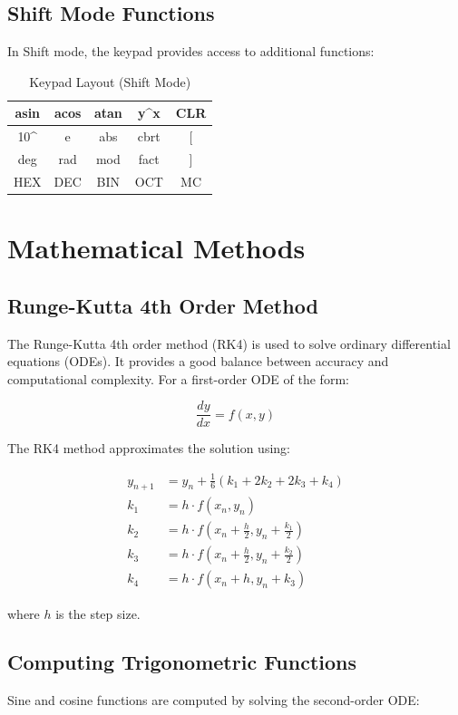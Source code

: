\documentclass[12pt,a4paper]{article}
\begin{document}
\subsection{Shift Mode Functions}
In Shift mode, the keypad provides access to additional functions:

\begin{table}[h]
\centering
\begin{tabular}{|c|c|c|c|c|}
\hline
asin & acos & atan & y\textasciicircum x & CLR \\
\hline
10\textasciicircum & e & abs & cbrt & [ \\
\hline
deg & rad & mod & fact & ] \\
\hline
HEX & DEC & BIN & OCT & MC \\
\hline
\end{tabular}
\caption{Keypad Layout (Shift Mode)}
\end{table}

\section{Mathematical Methods}
\subsection{Runge-Kutta 4th Order Method}
The Runge-Kutta 4th order method (RK4) is used to solve ordinary differential equations (ODEs). It provides a good balance between accuracy and computational complexity. For a first-order ODE of the form:

\begin{equation}
\frac{dy}{dx} = f(x, y)
\end{equation}

The RK4 method approximates the solution using:

\begin{align}
y_{n+1} &= y_n + \frac{1}{6}(k_1 + 2k_2 + 2k_3 + k_4) \\
k_1 &= h \cdot f(x_n, y_n) \\
k_2 &= h \cdot f(x_n + \frac{h}{2}, y_n + \frac{k_1}{2}) \\
k_3 &= h \cdot f(x_n + \frac{h}{2}, y_n + \frac{k_2}{2}) \\
k_4 &= h \cdot f(x_n + h, y_n + k_3)
\end{align}

where $h$ is the step size.

\subsection{Computing Trigonometric Functions}
Sine and cosine functions are computed by solving the second-order ODE:
\end{document}

